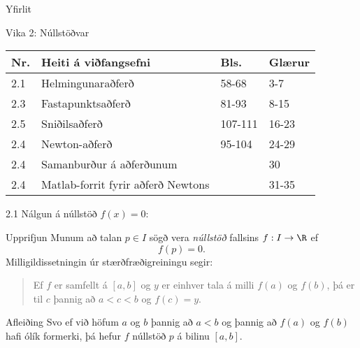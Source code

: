 \date{14.~og 16.~janúar 2015}



\begin{frame}
	\maketitle
\end{frame}

\section*{}
\begin{frame}{Yfirlit}
\begin{block}{Vika 2: Núllstöðvar}
\begin{center}
\begin{tabular}{|l|l|l|l|}\hline
Nr. &Heiti á viðfangsefni & Bls. & Glærur\\
\hline
2.1 & Helmingunaraðferð& 58-68 & 3-7\\
2.3 & Fastapunktsaðferð& 81-93 & 8-15\\
2.5 & Sniðilsaðferð& 107-111 & 16-23\\
2.4 & Newton-aðferð& 95-104 & 24-29\\
2.4 & Samanburður á aðferðunum & & 30\\
2.4 & Matlab-forrit fyrir aðferð Newtons & & 31-35 \\
\hline
\end{tabular}
\end{center}

\end{block}
\end{frame}

\begin{frame}{2.1 Nálgun á núllstöð  $f(x)=0$:} 

\begin{block}{Upprifjun}
Munum að talan  $p\in I$ sögð vera {\it núllstöð} fallsins $f:I\to \R$ ef
\begin{equation*}
	f(p)=0.
\end{equation*}\pause
Milligildissetningin úr stærðfræðigreiningu segir: 
\begin{quote}
	Ef $f$ er samfellt á $[a,b]$ og $y$ er einhver tala á milli $f(a)$ og $f(b)$, þá er til $c$ þannig að $a < c < b$ og $f(c) = y$.
\end{quote}
\end{block} 
\pause

\begin{block}{Afleiðing}
Svo ef við höfum $a$ og $b$ þannig að $a < b$ og þannig að
$f(a)$ og $f(b)$ hafi ólík formerki, þá hefur $f$ núllstöð $p$ á bilinu
$[a,b]$.
\end{block}
\end{frame}

